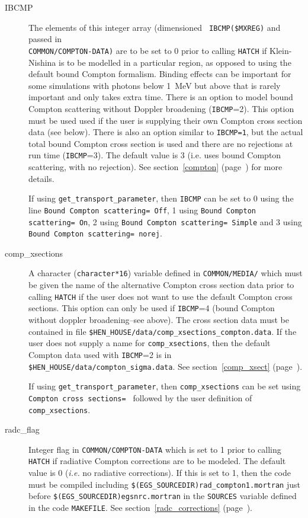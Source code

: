 \begin{description}
\item[IBCMP] The elements of this integer array (dimensioned {\tt
IBCMP(\$MXREG)} and passed in\\ {\tt COMMON/COMPTON-DATA)} are to be set to
0  prior to calling {\tt HATCH} if Klein-Nishina is to be modelled
in a particular region, as opposed to using the default bound Compton formalism.
Binding effects can be important for some simulations with photons below 1~MeV but
above that is rarely important and only takes extra time. There is an option
to model bound Compton scattering without Doppler broadening
({\tt IBCMP}=2).  This option must be used used if the user
is supplying their own Compton cross section data (see below).
There is also an option similar to {\tt IBCMP=1}, but the
actual total bound Compton cross section is used and there are
no rejections at run time ({\tt IBCMP}=3). The default
value is 3 (i.e. uses bound Compton scattering, with no rejection).
See section~\ref{compton} (page~\pageref{compton}) for more details.

If using {\tt get\_transport\_parameter}, then {\tt IBCMP} can be set to 0
using the line {\tt Bound Compton scattering= Off}, 1 using
{\tt Bound Compton scattering= On}, 2 using
{\tt Bound Compton scattering= Simple} and
3 using {\tt Bound Compton scattering= norej}.

\item[comp\_xsections] A character ({\tt character*16}) variable defined in
{\tt COMMON/MEDIA/} which must be given the name of the alternative
Compton cross section data prior to calling {\tt HATCH} if the user does
not want to use the default Compton cross sections.  This option can only
be used if {\tt IBCMP}=4 (bound Compton without doppler broadening--see above).
The cross section data must be contained in file
{\tt \$HEN\_HOUSE/data/comp\_xsections\_compton.data}.  If the user does
not supply a name for {\tt comp\_xsections}, then the default Compton
data used with {\tt IBCMP}=2 is in {\tt \$HEN\_HOUSE/data/compton\_sigma.data}.
See section~\ref{comp_xsect} (page~\pageref{comp_xsect}).

If using {\tt get\_transport\_parameter}, then {\tt comp\_xsections} can be
set using {\tt Compton cross sections= } followed by the user definition
of {\tt comp\_xsections}.

\item[radc\_flag] Integer flag in {\tt COMMON/COMPTON-DATA} which is set
to 1 prior to calling {\tt HATCH} if radiative Compton corrections are
to be modeled.  The default value is 0 ({\em i.e.} no radiative corrections).
If this is set to 1, then the code must be compiled including
{\tt \$(EGS\_SOURCEDIR)rad\_compton1.mortran} just before
{\tt \$(EGS\_SOURCEDIR)egsnrc.mortran} in the {\tt SOURCES} variable
defined in the code {\tt MAKEFILE}.  See section~\ref{radc_corrections}
(page~\pageref{radc_corrections}).


\end{description}
